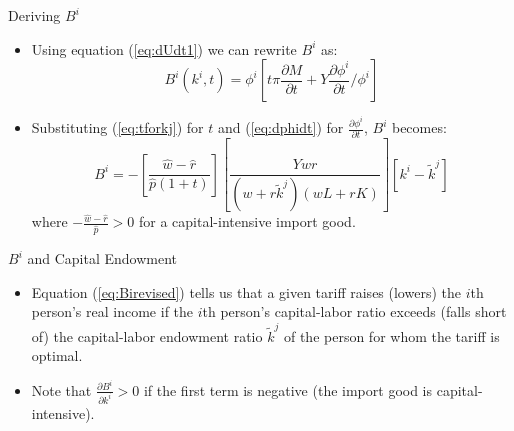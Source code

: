 \documentclass[aspectratio=169]{beamer}
\begin{document}

\begin{frame}{Deriving $ B^{i} $}

\begin{itemize}
    \item<1-> Using equation (\ref{eq:dUdt1}) we can rewrite $ B^{i} $ as:
    \begin{equation*}
        B^{i}\left( k^{i}, t \right) = \phi^{i} \left[ t \pi \frac{\partial M}{\partial t} +  Y \frac{\partial \phi^{i}}{\partial t} / \phi^{i} \right]
    \end{equation*}
    \item<2-> Substituting (\ref{eq:tforkj}) for $ t $ and (\ref{eq:dphidt}) for $ \frac{\partial \phi^{i}}{\partial t} $, $ B^{i} $ becomes:
    \begin{equation}
        B^{i} = -\left[ \frac{\hat{w} - \hat{r}}{\hat{p}\left( 1 + t \right)} \right] \left[ \frac{Ywr}{\left( w + r\tilde{k}^{j} \right) \left( wL + rK \right)} \right]\left[ k^{i} - \tilde{k}^{j} \right]
        \label{eq:Birevised}
    \end{equation}
    where $ -\frac{\hat{w} - \hat{r}}{\hat{p}} > 0 $ for a capital-intensive import good.
\end{itemize}
    
\end{frame}


\begin{frame}{$ B^{i} $ and Capital Endowment}

\begin{itemize}
    \item<1-> Equation (\ref{eq:Birevised}) tells us that a given tariff raises (lowers) the $ i $th person’s real income if the $ i $th person’s capital-labor ratio exceeds (falls short of) the capital-labor endowment ratio $ \tilde{k}^{j} $ of the person for whom the tariff is optimal.
    \item<2-> Note that $ \frac{\partial B^{i}}{\partial k^{i}} > 0 $ if the first term is negative (the import good is capital-intensive).
\end{itemize}
    
\end{frame}

\end{document}

